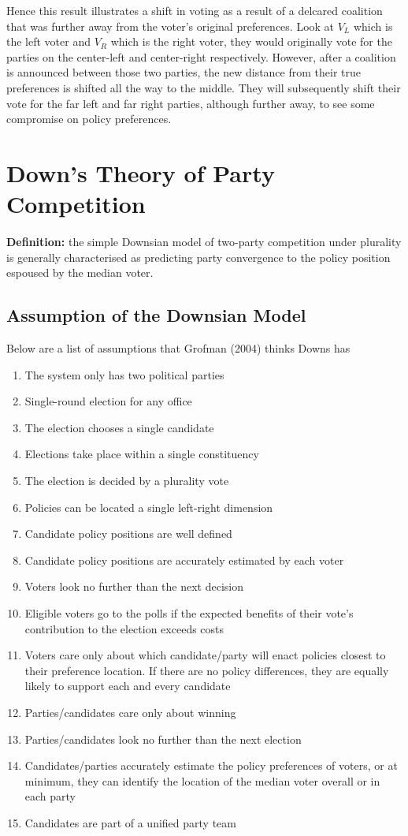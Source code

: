 \documentclass[12pt, letterpaper]{article}
\begin{document}
\begin{enumerate}
	Hence this result illustrates a shift in voting as a result of a delcared coalition that was further away from the voter's original preferences. Look at $V_L$ which is the left voter and $V_R$ which is the right voter, they would originally vote for the parties on the center-left and center-right respectively. However, after a coalition is announced between those two parties, the new distance from their true preferences is shifted all the way to the middle. They will subsequently shift their vote for the far left and far right parties, although further away, to see some compromise on policy preferences.
\end{enumerate}


\newpage
\section{Down's Theory of Party Competition}
\textbf{Definition:} the simple Downsian model of two-party competition under plurality is generally characterised as predicting party convergence to the policy position espoused by the median voter.

\subsection{Assumption of the Downsian Model}
Below are a list of assumptions that Grofman (2004) thinks Downs has
\begin{enumerate}
	\item The system only has two political parties
	\item Single-round election for any office
	\item The election chooses a single candidate
	\item Elections take place within a single constituency
	\item The election is decided by a plurality vote
	\item Policies can be located a single left-right dimension
	\item Candidate policy positions are well defined
	\item Candidate policy positions are accurately estimated by each voter
	\item Voters look no further than the next decision
	\item Eligible voters go to the polls if the expected benefits of their vote's contribution to the election exceeds costs
	\item Voters care only about which candidate/party will enact policies closest to their preference location. If there are no policy differences, they are equally likely to support each and every candidate
	\item Parties/candidates care only about winning
	\item Parties/candidates look no further than the next election
	\item Candidates/parties accurately estimate the policy preferences of voters, or at minimum, they can identify the location of the median voter overall or in each party
	\item Candidates are part of a unified party team
\end{enumerate}
\end{document}

